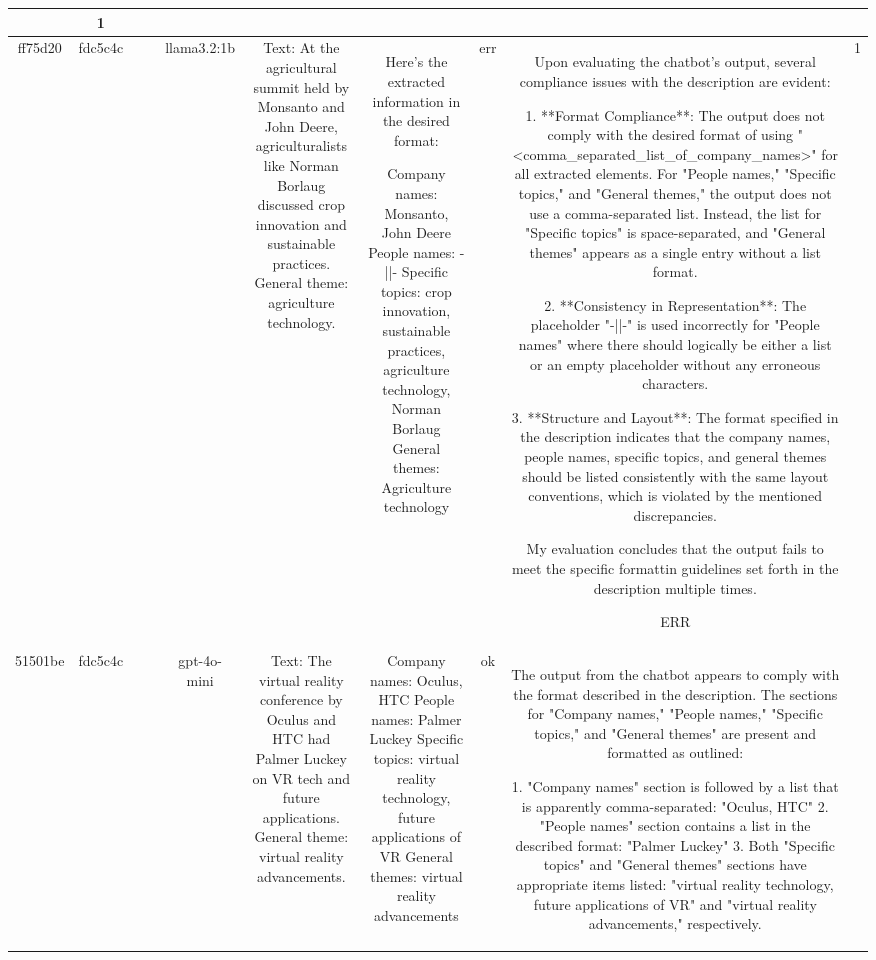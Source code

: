 \begin{table}[h!]
\begin{tabular}{|c|c|c|c|c|c|c|c|c|c|}
{ERR & 1\\
\hline
ff75d20 & fdc5c4c &  &  & llama3.2:1b & Text: At the agricultural summit held by Monsanto and John Deere, agriculturalists like Norman Borlaug discussed crop innovation and sustainable practices. General theme: agriculture technology. & Here's the extracted information in the desired format:

Company names: Monsanto, John Deere
People names: -||-
Specific topics: crop innovation, sustainable practices, agriculture technology, Norman Borlaug
General themes: Agriculture technology & err & Upon evaluating the chatbot's output, several compliance issues with the description are evident:

1. **Format Compliance**: The output does not comply with the desired format of using "<comma_separated_list_of_company_names>" for all extracted elements. For "People names," "Specific topics," and "General themes," the output does not use a comma-separated list. Instead, the list for "Specific topics" is space-separated, and "General themes" appears as a single entry without a list format.

2. **Consistency in Representation**: The placeholder "-||-" is used incorrectly for "People names" where there should logically be either a list or an empty placeholder without any erroneous characters.

3. **Structure and Layout**: The format specified in the description indicates that the company names, people names, specific topics, and general themes should be listed consistently with the same layout conventions, which is violated by the mentioned discrepancies.

My evaluation concludes that the output fails to meet the specific formattin guidelines set forth in the description multiple times.

ERR & 1\\
\hline
51501be & fdc5c4c &  &  & gpt-4o-mini & Text: The virtual reality conference by Oculus and HTC had Palmer Luckey on VR tech and future applications. General theme: virtual reality advancements. & Company names: Oculus, HTC  
People names: Palmer Luckey  
Specific topics: virtual reality technology, future applications of VR  
General themes: virtual reality advancements   & ok & The output from the chatbot appears to comply with the format described in the description. The sections for "Company names," "People names," "Specific topics," and "General themes" are present and formatted as outlined:

1. "Company names" section is followed by a list that is apparently comma-separated: "Oculus, HTC"
2. "People names" section contains a list in the described format: "Palmer Luckey"
3. Both "Specific topics" and "General themes" sections have appropriate items listed: "virtual reality technology, future applications of VR" and "virtual reality advancements," respectively.

}
\end{tabular}
\end{table}
